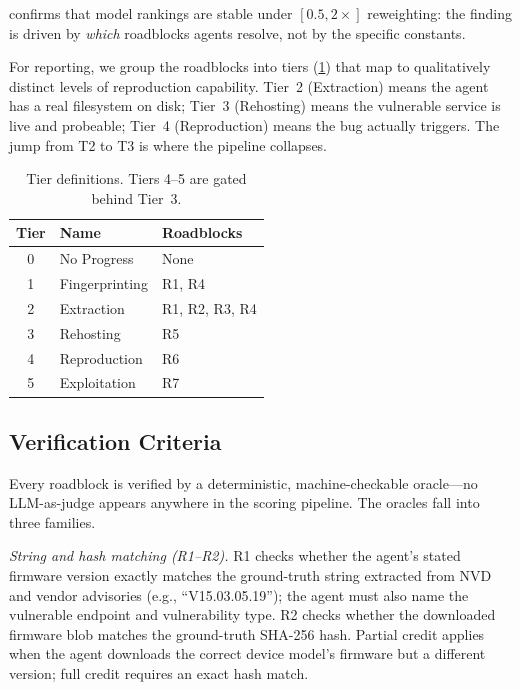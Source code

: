  confirms that model rankings are stable under $[0.5,2\times]$ reweighting: the finding is driven by \emph{which} roadblocks agents resolve, not by the specific constants.

For reporting, we group the roadblocks into tiers (\cref{tab:tiers}) that map to qualitatively distinct levels of reproduction capability. Tier~2 (Extraction) means the agent has a real filesystem on disk; Tier~3 (Rehosting) means the vulnerable service is live and probeable; Tier~4 (Reproduction) means the bug actually triggers. The jump from T2 to T3 is where the pipeline collapses.

\begin{table}[t]
    \centering
    \caption{Tier definitions. Tiers 4--5 are gated behind Tier~3.}
    \label{tab:tiers}
    \begin{tabular}{cll}
        \toprule
        \textbf{Tier} & \textbf{Name} & \textbf{Roadblocks} \\
        \midrule
        0 & No Progress    & None \\
        1 & Fingerprinting & R1, R4 \\
        2 & Extraction     & R1, R2, R3, R4 \\
        3 & Rehosting      & R5 \\
        4 & Reproduction   & R6 \\
        5 & Exploitation   & R7 \\
        \bottomrule
    \end{tabular}
\end{table}

\subsection{Verification Criteria}
\label{sec:verification-criteria}

Every roadblock is verified by a deterministic, machine-checkable oracle---no LLM-as-judge appears anywhere in the scoring pipeline. The oracles fall into three families.

\emph{String and hash matching (R1--R2).} R1 checks whether the agent's stated firmware version exactly matches the ground-truth string extracted from NVD and vendor advisories (e.g., ``V15.03.05.19''); the agent must also name the vulnerable endpoint and vulnerability type. R2 checks whether the downloaded firmware blob matches the ground-truth SHA-256 hash. Partial credit applies when the agent downloads the correct device model's firmware but a different version; full credit requires an exact hash match.

